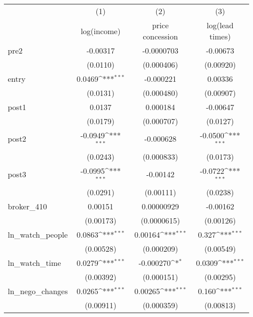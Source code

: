 {
\def\sym#1{\ifmmode^{#1}\else\(^{#1}\)\fi}
\begin{tabular}{l*{3}{c}}
\toprule
            &\multicolumn{1}{c}{(1)}&\multicolumn{1}{c}{(2)}&\multicolumn{1}{c}{(3)}\\
            &\multicolumn{1}{c}{log(income)}&\multicolumn{1}{c}{price concession}&\multicolumn{1}{c}{log(lead times)}\\
\midrule
pre2        &    -0.00317         &  -0.0000703         &    -0.00673         \\
            &    (0.0110)         &  (0.000406)         &   (0.00920)         \\
\addlinespace
entry       &      0.0469\sym{***}&   -0.000221         &     0.00336         \\
            &    (0.0131)         &  (0.000480)         &   (0.00907)         \\
\addlinespace
post1       &      0.0137         &    0.000184         &    -0.00647         \\
            &    (0.0179)         &  (0.000707)         &    (0.0127)         \\
\addlinespace
post2       &     -0.0949\sym{***}&   -0.000628         &     -0.0500\sym{***}\\
            &    (0.0243)         &  (0.000833)         &    (0.0173)         \\
\addlinespace
post3       &     -0.0995\sym{***}&    -0.00142         &     -0.0722\sym{***}\\
            &    (0.0291)         &   (0.00111)         &    (0.0238)         \\
\addlinespace
broker\_410  &     0.00151         &  0.00000929         &    -0.00162         \\
            &   (0.00173)         & (0.0000615)         &   (0.00126)         \\
\addlinespace
ln\_watch\_people&      0.0863\sym{***}&     0.00164\sym{***}&       0.327\sym{***}\\
            &   (0.00528)         &  (0.000209)         &   (0.00549)         \\
\addlinespace
ln\_watch\_time&      0.0279\sym{***}&   -0.000270\sym{*}  &      0.0309\sym{***}\\
            &   (0.00392)         &  (0.000151)         &   (0.00295)         \\
\addlinespace
ln\_nego\_changes&      0.0265\sym{***}&     0.00265\sym{***}&       0.160\sym{***}\\
            &   (0.00911)         &  (0.000359)         &   (0.00813)         \\

\end{tabular}}
